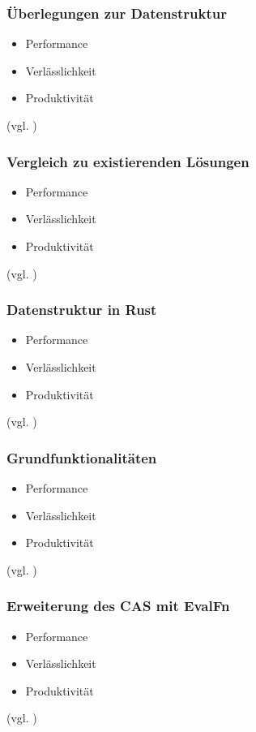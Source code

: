 \documentclass{beamer}
\begin{document}
\begin{frame}[fragile]
  \frametitle{Überlegungen zur Datenstruktur}
  \begin{itemize}
    \item Performance
    \pause
    \item Verlässlichkeit
    \pause
    \item Produktivität
  \end{itemize}
  {\small (vgl. \cite{WhyRust})}
\end{frame}

\begin{frame}[fragile]
  \frametitle{Vergleich zu existierenden Lösungen}
  \begin{itemize}
    \item Performance
    \pause
    \item Verlässlichkeit
    \pause
    \item Produktivität
  \end{itemize}
  {\small (vgl. \cite{WhyRust})}
\end{frame}

\begin{frame}[fragile]
  \frametitle{Datenstruktur in Rust}
  \begin{itemize}
    \item Performance
    \pause
    \item Verlässlichkeit
    \pause
    \item Produktivität
  \end{itemize}
  {\small (vgl. \cite{WhyRust})}
\end{frame}

\begin{frame}[fragile]
  \frametitle{Grundfunktionalitäten}
  \begin{itemize}
    \item Performance
    \pause
    \item Verlässlichkeit
    \pause
    \item Produktivität
  \end{itemize}
  {\small (vgl. \cite{WhyRust})}
\end{frame}

\begin{frame}[fragile]
  \frametitle{Erweiterung des CAS mit EvalFn}
  \begin{itemize}
    \item Performance
    \pause
    \item Verlässlichkeit
    \pause
    \item Produktivität
  \end{itemize}
  {\small (vgl. \cite{WhyRust})}
\end{frame}
\end{document}
